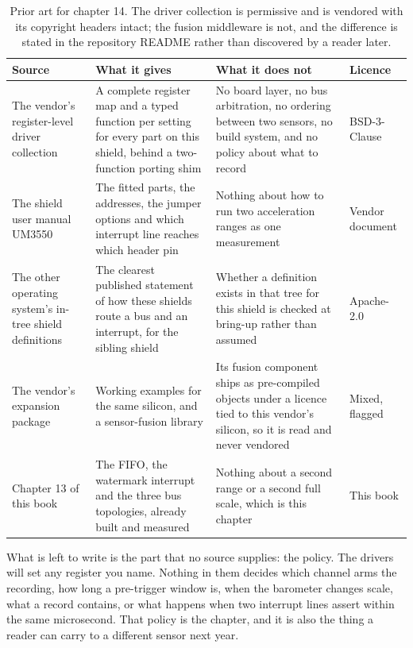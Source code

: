\begin{table}[H]\centering\small
\begin{tabular}{p{34mm}p{46mm}p{38mm}p{20mm}}
\toprule
Source & What it gives & What it does not & Licence \\
\midrule
The vendor's register-level driver collection & A complete register map and a typed function per setting for every part on this shield, behind a two-function porting shim & No board layer, no bus arbitration, no ordering between two sensors, no build system, and no policy about what to record & BSD-3-Clause \\
The shield user manual UM3550 & The fitted parts, the addresses, the jumper options and which interrupt line reaches which header pin & Nothing about how to run two acceleration ranges as one measurement & Vendor document \\
The other operating system's in-tree shield definitions & The clearest published statement of how these shields route a bus and an interrupt, for the sibling shield & Whether a definition exists in that tree for this shield is checked at bring-up rather than assumed & Apache-2.0 \\
The vendor's expansion package & Working examples for the same silicon, and a sensor-fusion library & Its fusion component ships as pre-compiled objects under a licence tied to this vendor's silicon, so it is read and never vendored & Mixed, flagged \\
Chapter 13 of this book & The FIFO, the watermark interrupt and the three bus topologies, already built and measured & Nothing about a second range or a second full scale, which is this chapter & This book \\
\bottomrule
\end{tabular}
\caption{Prior art for chapter 14. The driver collection is permissive and is vendored with its copyright headers intact; the fusion middleware is not, and the difference is stated in the repository README rather than discovered by a reader later.}
\end{table}

What is left to write is the part that no source supplies: the policy. The
drivers will set any register you name. Nothing in them decides which channel
arms the recording, how long a pre-trigger window is, when the barometer changes
scale, what a record contains, or what happens when two interrupt lines assert
within the same microsecond. That policy is the chapter, and it is also the
thing a reader can carry to a different sensor next year.

